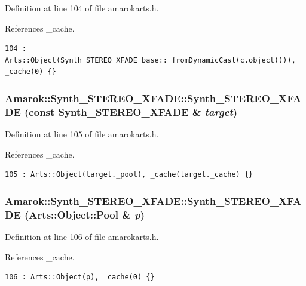 Definition at line 104 of file amarokarts.h.

References \_\-cache.



\footnotesize\begin{verbatim}104 : Arts::Object(Synth_STEREO_XFADE_base::_fromDynamicCast(c.object())), _cache(0) {}
\end{verbatim}\normalsize 
{}
\subsubsection{\setlength{\rightskip}{0pt plus 5cm}Amarok::Synth\_\-STEREO\_\-XFADE::Synth\_\-STEREO\_\-XFADE (const {\bf Synth\_\-STEREO\_\-XFADE} \& {\em target})\hspace{0.3cm}{\tt  [inline]}}\label{classAmarok_1_1Synth__STEREO__XFADE_Amarok_1_1Synth__STEREO__XFADEa4}




Definition at line 105 of file amarokarts.h.

References \_\-cache.



\footnotesize\begin{verbatim}105 : Arts::Object(target._pool), _cache(target._cache) {}
\end{verbatim}\normalsize 
{}
\subsubsection{\setlength{\rightskip}{0pt plus 5cm}Amarok::Synth\_\-STEREO\_\-XFADE::Synth\_\-STEREO\_\-XFADE (Arts::Object::Pool \& {\em p})\hspace{0.3cm}{\tt  [inline]}}\label{classAmarok_1_1Synth__STEREO__XFADE_Amarok_1_1Synth__STEREO__XFADEa5}




Definition at line 106 of file amarokarts.h.

References \_\-cache.



\footnotesize\begin{verbatim}106 : Arts::Object(p), _cache(0) {}
\end{verbatim}\normalsize 


